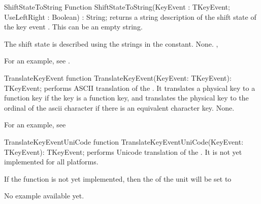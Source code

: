 \begin{function}{ShiftStateToString}
\Declaration
Function ShiftStateToString(KeyEvent : TKeyEvent; UseLeftRight : Boolean) : String;
\Description
{} returns a string description of the shift state
of the key event . This can be an empty string. 

The shift state is described using the strings in the  constant.
\Errors
None.
\SeeAlso
{}, 
\end{function}

For an example, see .

\begin{function}{TranslateKeyEvent}
\Declaration
function TranslateKeyEvent(KeyEvent: TKeyEvent): TKeyEvent;
\Description
{} performs ASCII translation of the .
It translates a physical key to a function key if the key is a function key,
and translates the physical key to the ordinal of the ascii character if 
there is an equivalent character key.
\Errors
None.
\SeeAlso
{}
\end{function}

For an example, see 

\begin{function}{TranslateKeyEventUniCode}
\Declaration
function TranslateKeyEventUniCode(KeyEvent: TKeyEvent): TKeyEvent;
\Description
{} performs Unicode translation of the 
. It is not yet implemented for all platforms.

\Errors
If the function is not yet implemented, then the  of the 
 unit will be set to 
\SeeAlso
\end{function}

No example available yet.

